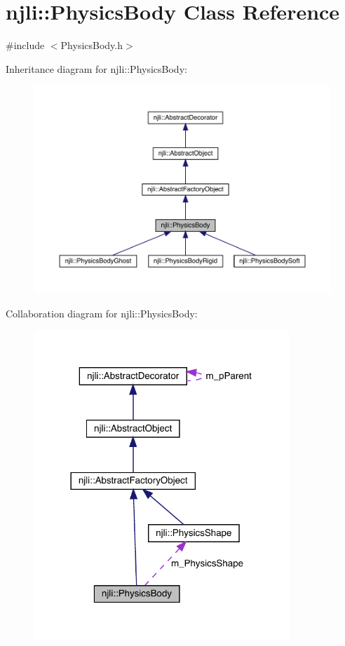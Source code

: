 \hypertarget{classnjli_1_1_physics_body}{}\section{njli\+:\+:Physics\+Body Class Reference}
\label{classnjli_1_1_physics_body}


{\ttfamily \#include $<$Physics\+Body.\+h$>$}



Inheritance diagram for njli\+:\+:Physics\+Body\+:\nopagebreak
\begin{figure}[H]
\begin{center}
\leavevmode
\includegraphics[width=350pt]{classnjli_1_1_physics_body__inherit__graph}
\end{center}
\end{figure}


Collaboration diagram for njli\+:\+:Physics\+Body\+:\nopagebreak
\begin{figure}[H]
\begin{center}
\leavevmode
\includegraphics[width=273pt]{classnjli_1_1_physics_body__coll__graph}
\end{center}
\end{figure}
